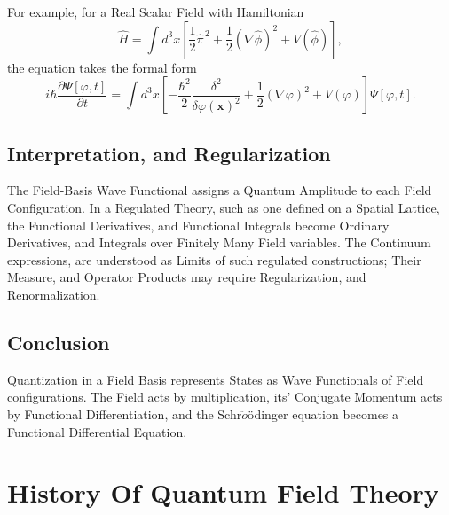 \documentclass[a4paper, 10pt, onepage]{elegantbook}
\begin{document}
For example, for a Real Scalar Field with Hamiltonian
\[
\hat{H}
=\int d^3x\left[
\frac{1}{2}\hat{\pi}^{\,2}
+\frac{1}{2}(\nabla\hat{\phi})^2
+V(\hat{\phi})
\right],
\]
the equation takes the formal form
\[
i\hbar\frac{\partial\Psi[\varphi,t]}{\partial t}
=
\int d^3x\left[
-\frac{\hbar^2}{2}
\frac{\delta^2}{\delta\varphi(\mathbf{x})^2}
+\frac{1}{2}(\nabla\varphi)^2
+V(\varphi)
\right]\Psi[\varphi,t].
\]

\subsection{Interpretation, and Regularization}

The Field-Basis Wave Functional assigns a Quantum Amplitude to each Field Configuration. In a Regulated Theory, such as one defined on a Spatial Lattice, the Functional Derivatives, and Functional Integrals become Ordinary Derivatives, and Integrals over Finitely Many Field variables. The Continuum expressions, are understood as Limits of such regulated constructions; Their Measure, and Operator Products may require Regularization, and Renormalization.

\subsection{Conclusion}

Quantization in a Field Basis represents States as Wave Functionals of Field configurations. The Field acts by multiplication, its' Conjugate Momentum acts by Functional Differentiation, and the Schr$\ddot{o}$ödinger equation becomes a Functional Differential Equation.














\newpage

\section{History Of Quantum Field Theory}
\end{document}
